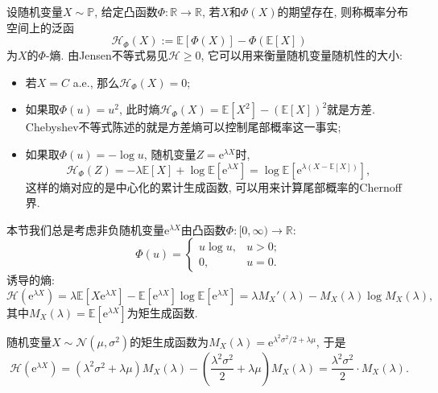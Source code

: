 设随机变量$X \sim \mathbb{P}$, 给定凸函数$\Phi \colon \mathbb{R} \to \mathbb{R}$, 若$X$和$\Phi(X)$的期望存在, 则称概率分布空间上的泛函
\begin{equation*}
	\mathcal{H}_\Phi(X) := \mathbb{E}[\Phi(X)] - \Phi(\mathbb{E}[X])  
\end{equation*}
为$X$的$\Phi$-熵.
由Jensen不等式易见$\mathcal{H} \geq 0$, 它可以用来衡量随机变量随机性的大小:  
\begin{itemize}
	\item 若$X = C$ a.e., 那么$\mathcal{H}_\Phi (X) = 0$; 
	\item 如果取$\Phi(u) = u^2$, 此时熵$\mathcal{H}_\Phi(X) = \mathbb{E}[X^2] - (\mathbb{E}[X])^2$就是方差. Chebyshev不等式陈述的就是方差熵可以控制尾部概率这一事实; 
	\item 如果取$\Phi(u) = - \log u$, 随机变量$Z = \mathrm{e}^{\lambda X}$时, 
		\begin{equation*}
			\mathcal{H}_\Phi(Z) 
			= - \lambda \mathbb{E}[X] + \log \mathbb{E}[\mathrm{e}^{\lambda X}] 
			= \log \mathbb{E}[\mathrm{e}^{\lambda(X - \mathbb{E}[X])}], 
		\end{equation*}
		这样的熵对应的是中心化的累计生成函数, 可以用来计算尾部概率的Chernoff界.	
\end{itemize}


本节我们总是考虑非负随机变量$\mathrm{e}^{\lambda X}$由凸函数$\Phi \colon [0, \infty) \to \mathbb{R}$: 
\begin{equation*}
	\Phi(u) = 
	\begin{cases}
		u \log u, & u > 0; \\ 0, & u = 0. 
	\end{cases}
\end{equation*}
诱导的熵: 
\begin{equation}\label{eq:EntropyByMGF}
	\mathcal{H}(\mathrm{e}^{\lambda X}) 
	= \lambda \mathbb{E}[ X \mathrm{e}^{\lambda X}] - \mathbb{E}[\mathrm{e}^{\lambda X}] \log \mathbb{E}[\mathrm{e}^{\lambda X}]
	= \lambda M_X'(\lambda) - M_X(\lambda) \log M_X(\lambda), 
\end{equation}
其中$M_X(\lambda) = \mathbb{E}[\mathrm{e}^{\lambda X}]$为矩生成函数. 

\begin{example}[Gauss随机变量的熵]
	随机变量$X \sim \mathcal{N}(\mu, \sigma^2)$的矩生成函数为$M_X(\lambda) = \mathrm{e}^{\lambda^2 \sigma^2 / 2 + \lambda \mu}$, 于是
	\begin{equation}\label{eq:EntropyOfGaussianRV}
		\mathcal{H}(\mathrm{e}^{\lambda X}) 
		= (\lambda^2 \sigma^2 + \lambda \mu) M_X(\lambda) - \left(\frac{\lambda^2 \sigma^2}{2} + \lambda\mu\right) M_X(\lambda) 
		= \frac{\lambda^2 \sigma^2}{2} \cdot M_X(\lambda). 
	\end{equation}
\end{example}

